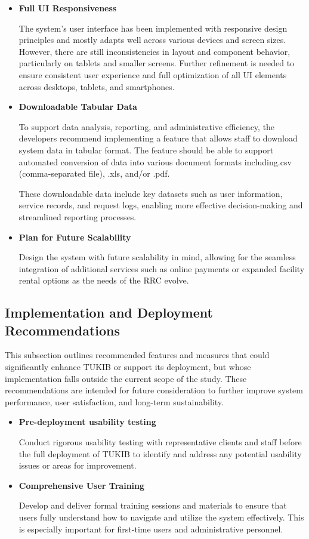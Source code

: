 \begin{itemize}
	\item \textbf{Full UI Responsiveness}
	
	The system’s user interface has been implemented with responsive design principles and mostly adapts well across various devices and screen sizes. However, there are still inconsistencies in layout and component behavior, particularly on tablets and smaller screens. Further refinement is needed to ensure consistent user experience and full optimization of all UI elements across desktops, tablets, and smartphones.
	
	\item \textbf{Downloadable Tabular Data}
	
	To support data analysis, reporting, and administrative efficiency, the developers recommend implementing a feature that allows staff to download system data in tabular format. The feature should be able to support automated conversion of data into various document formats including.csv (comma-separated file), .xls,	and/or .pdf.
	
	These downloadable data include key datasets such as user information, service records, and request logs, enabling more effective decision-making and streamlined reporting processes.
	
	\item \textbf{Plan for Future Scalability}
	
	Design the system with future scalability in mind, allowing for the seamless integration of additional services such as online payments or expanded facility rental options as the needs of the RRC evolve.
	
\end{itemize}

\subsection{Implementation and Deployment Recommendations}

This subsection outlines recommended features and measures that could significantly enhance TUKIB or support its deployment, but whose implementation falls outside the current scope of the study. These recommendations are intended for future consideration to further improve system performance, user satisfaction, and long-term sustainability.

\begin{itemize}
	
	\item \textbf{Pre-deployment usability testing}
	
	Conduct rigorous usability testing with representative clients and staff before the full deployment of TUKIB to identify and address any potential usability issues or areas for improvement.
	
	\item \textbf{Comprehensive User Training}
	
	Develop and deliver formal training sessions and materials to ensure that users fully understand how to navigate and utilize the system effectively. This is especially important for first-time users and administrative personnel.
	
\end{itemize}